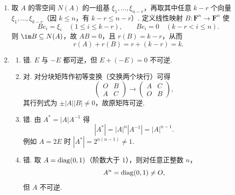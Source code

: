 \begin{enumerate}
    \item 取 $A$ 的零空间 $N(A)$ 的一组基 $\xi_1,\ldots,\xi_{n-r}$，再取其中任意 $k-r$ 个向量 $\xi_1,\ldots,\xi_{k-r}$（因 $k\leqslant n$，有 $k-r\leqslant n-r$）. 定义线性映射 $B:\mathbf{F}^n\to\mathbf{F}^n$ 使
    \[
        Be_i=\xi_i\quad(1\leqslant i\leqslant k-r),\qquad
        Be_i=0\quad(k-r<i\leqslant n).
    \]
    则 $\im B\subseteq N(A)$，故 $AB=0$，且 $r(B)=k-r$，从而
    \[
        r(A)+r(B)=r+(k-r)=k.
    \]

    \item
    \begin{enumerate}
        \item 错. $E$ 与 $-E$ 都可逆，但 $E+(-E)=0$ 不可逆.

        \item 对. 对分块矩阵作初等变换（交换两个块行）可得
        \[
            \begin{pmatrix}O&B\\A&C\end{pmatrix}
            \longrightarrow\begin{pmatrix}A&C\\O&B\end{pmatrix},
        \]
        其行列式为 $\pm|A||B|\neq 0$，故原矩阵可逆.

        \item 错. 由 $A^*=|A|A^{-1}$ 得
        \[
            |A^*|=|A|^n|A^{-1}|=|A|^{n-1}.
        \]
        例如 $A=2E$ 时 $|A^*|=2^{n(n-1)}\neq 1$.

        \item 错. 取 $A=\operatorname{diag}(0,1)$（阶数大于 $1$），则对任意正整数 $n$，
        \[
            A^n=\operatorname{diag}(0,1)\neq O,
        \]
        但 $A$ 不可逆.
    \end{enumerate}
\end{enumerate}

\clearpage
